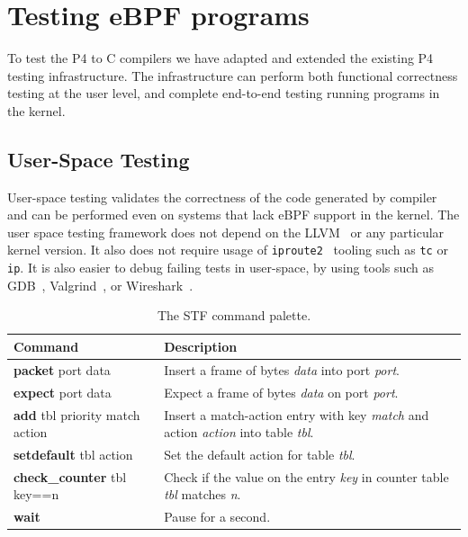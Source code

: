 \section{Testing eBPF programs}\label{sec:testing}

To test the P4 to C compilers we have adapted and extended the
existing P4 testing infrastructure.  The infrastructure can perform
both functional correctness testing at the user level, and complete
end-to-end testing running programs in the kernel.

\subsection{User-Space Testing}

User-space testing validates the correctness of the code generated by
compiler and can be performed even on systems that lack eBPF support
in the kernel.  The user space testing framework does not depend on
the LLVM~\cite{llvm} or any particular kernel version.  It also does
not require usage of \texttt{iproute2}~\cite{iproute} tooling such as
\texttt{tc} or \texttt{ip}.  It is also easier to debug failing tests
in user-space, by using tools such as GDB~\cite{gdb},
Valgrind~\cite{valgrind}, or Wireshark~\cite{wireshark}.

\begin{table}[h]
  \footnotesize
  \begin{center}
    \begin{tabular}{|p{2.8cm}|p{4.3cm}|} \hline
      \textbf{Command} & \textbf{Description} \\ \hline \hline
      \textbf{packet} port data & Insert a frame of bytes
      \textit{data} into port \textit{port}.    \\ \hline
      \textbf{expect} port data & Expect a frame of bytes
      \textit{data} on port \textit{port}.  \\ \hline
      \textbf{add} tbl priority match action & Insert a
      match-action entry with key \textit{match} and action
      \textit{action} into table \textit{tbl}. \\ \hline
      \textbf{setdefault} tbl action & Set the default action for table
      \textit{tbl}. \\
      \hline
      \textbf{check\_counter} tbl key==n & Check if the value on
      the entry \textit{key} in counter table \textit{tbl} matches
      \textit{n}.  \\
      \hline
      \textbf{wait} & Pause for a second. \\ \hline
    \end{tabular}
    \caption{The STF command palette.}\label{table:stf}
  \end{center}
\end{table}

